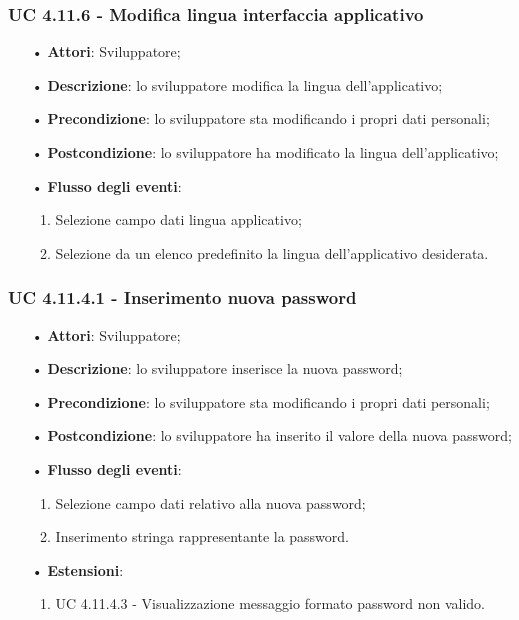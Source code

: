 \subsubsection{UC 4.11.6 - Modifica lingua interfaccia applicativo}
\begin{itemize}
	\item[•]\textbf{Attori}: Sviluppatore;
	\item[•]\textbf{Descrizione}: lo sviluppatore modifica la lingua dell'applicativo;
	\item[•]\textbf{Precondizione}: lo sviluppatore sta modificando i propri dati personali;
	\item[•]\textbf{Postcondizione}: lo sviluppatore ha modificato la lingua dell'applicativo; 
	\item[•]\textbf{Flusso degli eventi}: 
	\begin{enumerate}
		\item Selezione campo dati lingua applicativo;
		\item Selezione da un elenco predefinito la lingua dell'applicativo desiderata.
	\end{enumerate}
\end{itemize}


\subsubsection{UC 4.11.4.1 - Inserimento nuova password}
\begin{itemize}
	\item[•]\textbf{Attori}: Sviluppatore;
	\item[•]\textbf{Descrizione}: lo sviluppatore inserisce la nuova password;
	\item[•]\textbf{Precondizione}: lo sviluppatore sta modificando i propri dati personali;
	\item[•]\textbf{Postcondizione}: lo sviluppatore ha inserito il valore della nuova password; 
	\item[•]\textbf{Flusso degli eventi}: 
	\begin{enumerate}
		\item Selezione campo dati relativo alla nuova password;
		\item Inserimento stringa rappresentante la password.
	\end{enumerate}
	\item[•]\textbf{Estensioni}:
	\begin{enumerate}
		\item UC 4.11.4.3 - Visualizzazione messaggio formato password non valido.
	\end{enumerate}
\end{itemize}

